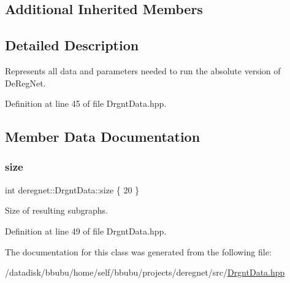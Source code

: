 \subsection*{Additional Inherited Members}


\subsection{Detailed Description}
Represents all data and parameters needed to run the absolute version of De\+Reg\+Net. 

Definition at line 45 of file Drgnt\+Data.\+hpp.



\subsection{Member Data Documentation}
\mbox{\label{classderegnet_1_1DrgntData_ae921ab4e0b12be7f488cfd4db2b1623c}} 
\subsubsection{\texorpdfstring{size}{size}}
{\footnotesize\ttfamily int deregnet\+::\+Drgnt\+Data\+::size \{ 20 \}}



Size of resulting subgraphs. 



Definition at line 49 of file Drgnt\+Data.\+hpp.



The documentation for this class was generated from the following file\+:\begin{DoxyCompactItemize}
\item 
/datadisk/bbubu/home/self/bbubu/projects/deregnet/src/\hyperlink{DrgntData_8hpp}{Drgnt\+Data.\+hpp}\end{DoxyCompactItemize}
